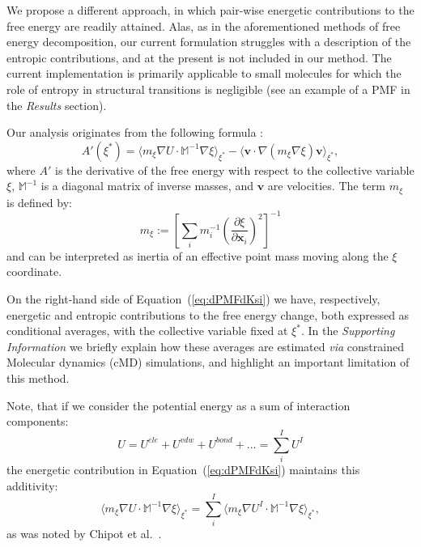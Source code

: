 \documentclass[a4paper,11pt,twoside]{book}%
\begin{document}
{\color{black}
We propose a different approach, in which pair-wise energetic contributions to the free energy are readily attained.
Alas, as in the aforementioned methods of free energy decomposition, our current formulation struggles with a description of the entropic contributions, and at the present is not included in our method.
The current implementation is primarily applicable to small molecules for which the role of entropy in structural transitions is negligible (see an example of a PMF in the \emph{Results} section).
}

Our analysis originates from the following formula \cite{carter1989constrained}:
\begin{equation}
\label{eq:dPMFdKsi}
A'(\xi^*)  =  \langle m_\xi \nabla U\cdot \mathbb{M}^{-1}\nabla\xi\rangle_{\xi^*}  - \langle \mathbf{v}\cdot\nabla(m_\xi\nabla\xi)\mathbf{v} \rangle_{\xi^*},
\end{equation}
where $A'$ is the derivative of the free energy with respect to the collective variable $\xi$, $\mathbb{M}^{-1}$ is a diagonal matrix of inverse masses, and $\mathbf{v}$ are velocities.
The term $m_\xi$ is defined by:
\begin{equation}
m_\xi := \left[ \sum_i m_i^{-1} \left(\frac{\partial\xi}{\partial\mathbf{x}_i}\right)^{2} \right]^{-1} 
\end{equation}
and can be interpreted as inertia of an effective point mass moving along the $\xi$ coordinate.

On the right-hand side of Equation~(\ref{eq:dPMFdKsi}) we have, respectively, energetic and entropic contributions to the free energy change, both expressed as conditional averages, with the collective variable fixed at $\xi^*$.
In the \emph{Supporting Information} we briefly explain how these averages are estimated \emph{via} constrained Molecular dynamics (cMD) simulations, and highlight an important limitation of this method.

Note, that if we consider the potential energy as a sum of interaction components:
\begin{equation}
\nonumber U = U^{ele}+U^{vdw}+U^{bond}+\ldots =  \sum_{i}^I U^I 
\end{equation}
the  energetic contribution in Equation~(\ref{eq:dPMFdKsi}) maintains this additivity:
\begin{equation}
\langle m_\xi  \nabla U\cdot \mathbb{M}^{-1} \nabla\xi\rangle_{\xi^*} =  \sum_i^{I} \langle m_\xi \nabla U^I\cdot \mathbb{M}^{-1}\nabla\xi\rangle_{\xi^*} ,
\end{equation}
as was noted by Chipot et al.~\cite{chipot2007free}.
\end{document}
